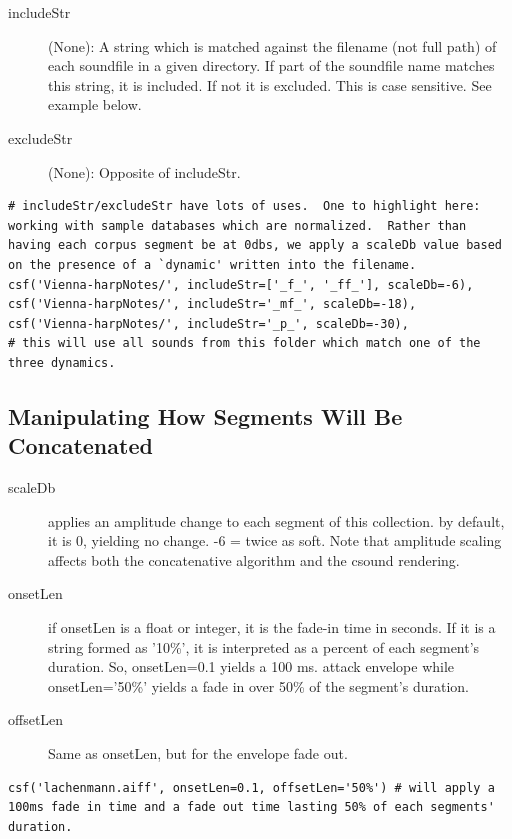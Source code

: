 \documentclass{article}
\begin{document}
\begin{spacing}{1.2}
\begin{description}
\item[includeStr] (None): A string which is matched against the filename (not full path) of each soundfile in a given directory.  If part of the soundfile name matches this string, it is included.  If not it is excluded.  This is case sensitive.  See example below.

\item[excludeStr] (None): Opposite of includeStr.
\end{description}

\begin{lstlisting}
# includeStr/excludeStr have lots of uses.  One to highlight here: working with sample databases which are normalized.  Rather than having each corpus segment be at 0dbs, we apply a scaleDb value based on the presence of a `dynamic' written into the filename.
csf('Vienna-harpNotes/', includeStr=['_f_', '_ff_'], scaleDb=-6),
csf('Vienna-harpNotes/', includeStr='_mf_', scaleDb=-18),
csf('Vienna-harpNotes/', includeStr='_p_', scaleDb=-30),
# this will use all sounds from this folder which match one of the three dynamics.
\end{lstlisting}





\subsection{Manipulating How Segments Will Be Concatenated}
\begin{description}
\item[scaleDb] applies an amplitude change to each segment of this collection. by default, it is 0, yielding no change. -6 = twice as soft.  Note that amplitude scaling affects both the concatenative algorithm and the csound rendering.  

\item[onsetLen] if onsetLen is a float or integer, it is the fade-in time in seconds.  If it is a string formed as '10\%', it is interpreted as a percent of each segment's duration.  So, onsetLen=0.1 yields a 100 ms. attack envelope while onsetLen='50\%' yields a fade in over 50\% of the segment's duration.

\item[offsetLen] Same as onsetLen, but for the envelope fade out.

\end{description}
\begin{lstlisting}
csf('lachenmann.aiff', onsetLen=0.1, offsetLen='50%') # will apply a 100ms fade in time and a fade out time lasting 50% of each segments' duration.
\end{lstlisting}
\begin{description}


\end{description}
\end{spacing}
\end{document}
